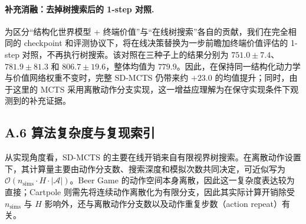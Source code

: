 \documentclass[UTF8]{ctexart}
\let\oldparagraph\paragraph
\renewcommand{\paragraph}[1]{\oldparagraph{#1}\mbox{}}
\begin{document}
\paragraph{补充消融：去掉树搜索后的 1-step 对照.}
为区分“结构化世界模型 + 终端价值”与“在线树搜索”各自的贡献，我们在完全相同的 checkpoint 和评测协议下，将在线决策替换为一步前瞻加终端价值评估的 1-step 对照，不再执行树搜索。该对照在三种子上的结果分别为 \(751.0\pm7.4\)、\(781.9\pm81.3\) 和 \(806.7\pm19.6\)，整体均值为 \(779.9\)。因此，在保持同一结构化动力学与价值网络权重不变时，完整 SD-MCTS 仍带来约 \(+23.0\) 的均值提升；同时，由于这里的 MCTS 采用离散动作分支实现，这一增益应理解为在保守实现条件下观测到的补充证据。

\hypertarget{a.6-complexity-and-reproducibility-index}{%
\subsection{A.6 算法复杂度与复现索引}\label{a.6-complexity-and-reproducibility-index}}

从实现角度看，SD-MCTS 的主要在线开销来自有限视界树搜索。在离散动作设置下，其计算量主要由动作分支数、搜索深度和模拟次数共同决定，可近似写为 \(\mathcal{O}(n_{\text{sims}} \cdot H \cdot |\mathcal{A}|)\)。Beer Game 的动作空间本身离散，因此这一复杂度表达较为直接；Cartpole 则需先将连续动作离散化为有限分支，因此其实际计算开销除受 \(n_{\text{sims}}\) 与 \(H\) 影响外，还与离散动作分支数以及动作重复步数（action repeat）有关。
\end{document}
